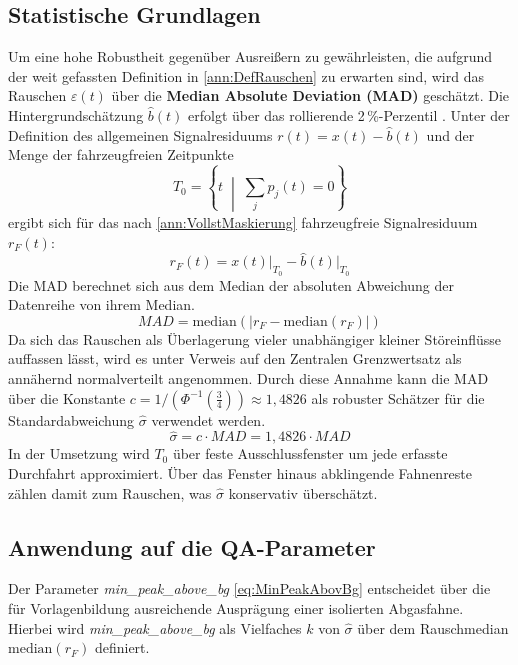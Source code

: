\subsection{Statistische Grundlagen}
Um eine hohe Robustheit gegenüber Ausreißern zu gewährleisten, die aufgrund der weit gefassten Definition in \autoref{ann:DefRauschen} zu erwarten sind, wird das Rauschen $\varepsilon(t)$ über die \textbf{Median Absolute Deviation (MAD)} geschätzt. Die Hintergrundschätzung $\hat{b}(t)$  erfolgt über das rollierende 2\,\%-Perzentil \cite[vgl.][S. 11700]{farrenHighlyDisaggregatedParticulate2025}. Unter der Definition des allgemeinen Signalresiduums $r(t) = x(t) - \hat{b}(t)$ und der Menge der fahrzeugfreien Zeitpunkte 
\begin{equation}
T_0 = \left\{ t \;\middle|\; \sum_{j}p_{j}(t) = 0 \right\}
\end{equation}
ergibt sich für das nach \autoref{ann:VollstMaskierung} fahrzeugfreie Signalresiduum $r_F(t)$:
\begin{equation}
r_F(t) = x(t)\big|_{T_0} - \hat{b}(t)\big|_{T_0}
\end{equation}
Die MAD berechnet sich aus dem Median der absoluten Abweichung der Datenreihe von ihrem Median.
\begin{equation}
    MAD = \mathrm{median}(|r_F - \mathrm{median}(r_F) |)
\end{equation}
 Da sich das Rauschen als Überlagerung vieler unabhängiger kleiner Störeinflüsse auffassen lässt, wird es unter Verweis auf den Zentralen Grenzwertsatz \cite[vgl.][S. 324]{fahrmeirStatistikWegZur2024} als annähernd normalverteilt angenommen. Durch diese Annahme kann die MAD über die Konstante $c=1 / \left(\Phi^{-1}\left( \frac{3}{4} \right) \right)\approx 1,4826$ als robuster Schätzer für die Standardabweichung $\widehat{\sigma}$ verwendet werden.
\begin{equation}
    \widehat{\sigma} = c \cdot MAD = 1,4826 \cdot MAD
\end{equation}
In der Umsetzung wird $T_0$ über feste Ausschlussfenster um jede erfasste Durchfahrt approximiert. Über das Fenster hinaus abklingende Fahnenreste zählen damit zum Rauschen, was $\widehat{\sigma}$ konservativ überschätzt.

\subsection{Anwendung auf die QA-Parameter}
Der Parameter \textit{min\_peak\_above\_bg} \eqref{eq:MinPeakAbovBg} entscheidet über die für Vorlagenbildung ausreichende Ausprägung einer isolierten Abgasfahne. Hierbei wird \textit{min\_peak\_above\_bg} als Vielfaches $k$ von $\widehat{\sigma}$ über dem Rauschmedian $\mathrm{median}(r_F)$ definiert. 

